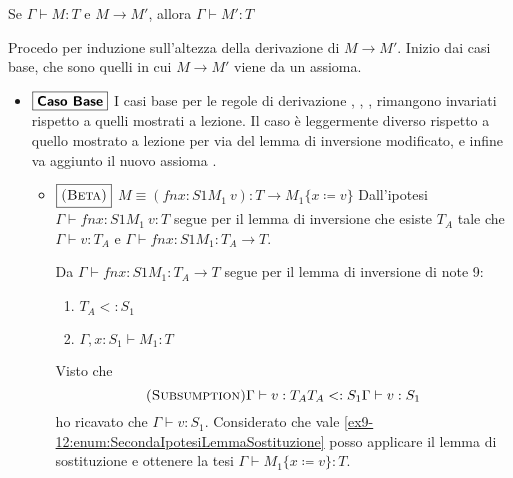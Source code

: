	Se $\Gamma \vdash M : T$ e $M \longrightarrow M'$, allora
	$\Gamma \vdash M':T$


Procedo per induzione sull'altezza della derivazione di $M \longrightarrow M'$.
Inizio dai casi base, che sono quelli in cui $M \longrightarrow M'$ viene da un assioma.
\begin{itemize}
	\item $\boxed{\text{\textbf{Caso Base}}}$
	I casi base per le regole di derivazione , , ,  rimangono
	invariati rispetto a quelli mostrati a lezione. Il caso  \`e leggermente diverso rispetto a quello 
	mostrato a lezione per via del lemma di inversione modificato, e infine va aggiunto il nuovo assioma .
	\begin{itemize}
		
		\item $\boxed{\textsc{(Beta)}}$
		$M\equiv (fn x:S1 M_1\ v) : T \longrightarrow M_1 \{x \coloneqq v\}$  
		Dall'ipotesi $\Gamma \vdash fn x:S1 M_1\ v : T$ segue per il lemma di inversione 
		che esiste $T_A$ tale che $\Gamma \vdash v : T_A$ e $\Gamma \vdash fn x:S1M_1: T_A \rightarrow T$.
		
		Da $\Gamma \vdash fn x:S1M_1 : T_A \rightarrow T$ segue per il lemma di inversione di note 9:
		\begin{enumerate}
			\item $T_A <: S_1$
			\item $\Gamma, x : S_1 \vdash M_1 : T$
			\label{ex9-12:enum:SecondaIpotesiLemmaSostituzione}
		\end{enumerate}
			
		Visto che
		$$
		{\textsc{(Subsumption)}}
		{\Gamma \vdash v : T_A}
		{T_A <: S_1}
		{\Gamma \vdash v : S_1}
		$$
		ho ricavato che $\Gamma \vdash v : S_1$. Considerato che vale \ref{ex9-12:enum:SecondaIpotesiLemmaSostituzione} posso applicare
		il lemma di sostituzione e ottenere la tesi $\Gamma \vdash M_1 \{x \coloneqq v \} : T$.
		

\end{itemize}
\end{itemize}
